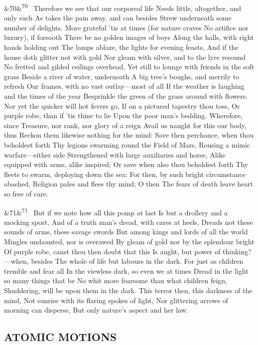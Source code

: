 \documentclass[12pt]{article}
\newcommand{\para}[1][]{\par\noindent\ifx&#1&\else\textsuperscript{\footnotesize #1}~\fi}
\begin{document}
\para[70] Therefore we see that our corporeal life Needs little, altogether, and only such As takes the pain away, and can besides Strew underneath some number of delights. More grateful 'tis at times (for nature craves No artifice nor luxury), if forsooth There be no golden images of boys Along the halls, with right hands holding out The lamps ablaze, the lights for evening feasts, And if the house doth glitter not with gold Nor gleam with silver, and to the lyre resound No fretted and gilded ceilings overhead, Yet still to lounge with friends in the soft grass Beside a river of water, underneath A big tree's boughs, and merrily to refresh Our frames, with no vast outlay---most of all If the weather is laughing and the times of the year Besprinkle the green of the grass around with flowers. Nor yet the quicker will hot fevers go, If on a pictured tapestry thou toss, Or purple robe, than if 'tis thine to lie Upon the poor man's bedding. Wherefore, since Treasure, nor rank, nor glory of a reign Avail us naught for this our body, thus Reckon them likewise nothing for the mind: Save then perchance, when thou beholdest forth Thy legions swarming round the Field of Mars, Rousing a mimic warfare---either side Strengthened with large auxiliaries and horse, Alike equipped with arms, alike inspired; Or save when also thou beholdest forth Thy fleets to swarm, deploying down the sea: For then, by such bright circumstance abashed, Religion pales and flees thy mind; O then The fears of death leave heart so free of care.

\para[71] But if we note how all this pomp at last Is but a drollery and a mocking sport, And of a truth man's dread, with cares at heels, Dreads not these sounds of arms, these savage swords But among kings and lords of all the world Mingles undaunted, nor is overawed By gleam of gold nor by the splendour bright Of purple robe, canst thou then doubt that this Is aught, but power of thinking?---when, besides The whole of life but labours in the dark. For just as children tremble and fear all In the viewless dark, so even we at times Dread in the light so many things that be No whit more fearsome than what children feign, Shuddering, will be upon them in the dark. This terror then, this darkness of the mind, Not sunrise with its flaring spokes of light, Nor glittering arrows of morning can disperse, But only nature's aspect and her law.

\subsection*{ATOMIC MOTIONS}
\end{document}
